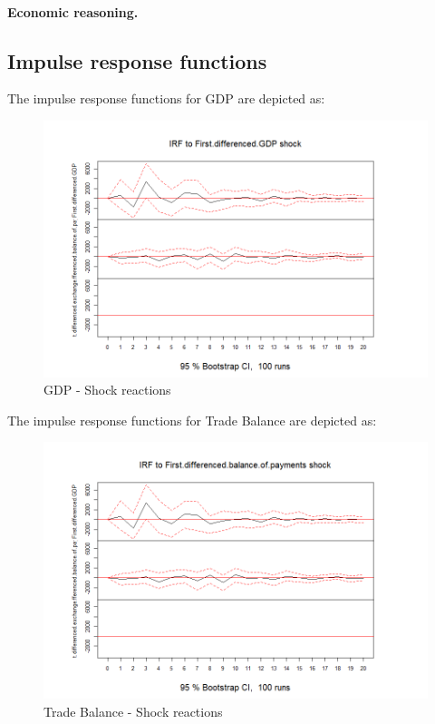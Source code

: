 \documentclass[
]{article}
\begin{document}
\paragraph{Economic reasoning.}

\subsection{Impulse response functions}

The impulse response functions for GDP are depicted as:

\begin{figure}

{\centering \includegraphics[width=0.8\linewidth]{../results/IRF_plots/IRF_to_First.differenced.GDP} 

}

\caption{GDP - Shock reactions}\label{fig:unnamed-chunk-24}
\end{figure}

The impulse response functions for Trade Balance are depicted as:

\begin{figure}

{\centering \includegraphics[width=0.8\linewidth]{../results/IRF_plots/IRF_to_First.differenced.balance.of.payments} 

}

\caption{Trade Balance - Shock reactions}\label{fig:unnamed-chunk-25}
\end{figure}
\end{document}

